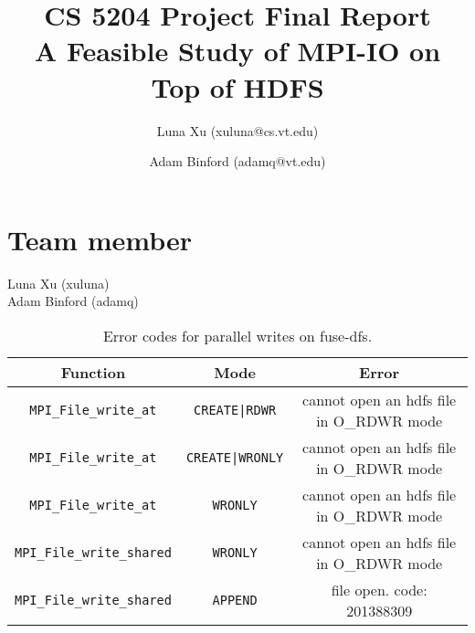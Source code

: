 \documentclass[11pt,titlepage]{article}
\author{Luna Xu (xuluna@cs.vt.edu) \and Adam Binford (adamq@vt.edu)}
\title{CS 5204 Project Final Report \\ A Feasible Study of MPI-IO on Top of HDFS}
\newcommand{\otoprule}{\midrule[\heavyrulewidth]}
\begin{document}
\maketitle

\section{Team member}
Luna Xu (xuluna)\\
Adam Binford (adamq)







\begin{table}[t]
	\centering
	\small
	\begin{tabular}{ccc}
		\toprule
	{\bf Function} &{\bf Mode} &{\bf Error} \\\otoprule
		{\tt MPI\_File\_write\_at} & {\tt CREATE|RDWR} & cannot open an
		hdfs file in O\_RDWR mode \\
		{\tt MPI\_File\_write\_at} & {\tt CREATE|WRONLY} & cannot open an
		hdfs file in O\_RDWR mode \\
		{\tt MPI\_File\_write\_at} & {\tt WRONLY} & cannot open an
		hdfs file in O\_RDWR mode \\
		{\tt MPI\_File\_write\_shared} & {\tt WRONLY} & cannot open an
		hdfs file in O\_RDWR mode \\
		{\tt MPI\_File\_write\_shared} & {\tt APPEND} &file open. code:
		201388309\\\bottomrule 
	\end{tabular}
	\caption{\small Error codes for parallel writes on fuse-dfs.}
	\label{tab:write}
\end{table}
{}

\end{document}
